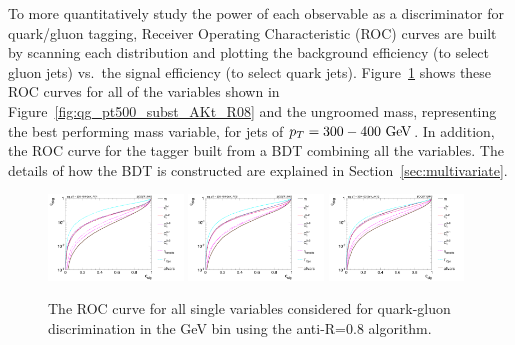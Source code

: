 To more quantitatively study the power of each observable as a
discriminator for quark/gluon tagging, Receiver Operating Characteristic (ROC) curves are built by scanning each distribution
and plotting the background efficiency (to select gluon jets) vs.~the signal efficiency (to select quark jets). 
Figure~\ref{fig:qg_pt300_single} shows these ROC curves for all of the variables shown in 
Figure~\ref{fig:qg_pt500_subst_AKt_R08} and the ungroomed mass, representing the 
best performing mass variable, for jets of $\pt=300-400\GeV$. In addition, the ROC curve for 
the tagger built from a BDT combining all the variables. The details of how the BDT is constructed 
are explained in Section~\ref{sec:multivariate}. 

\begin{figure}
\begin{center}
\includegraphics[width=0.32\textwidth]{./Figures/QGTagging/pT300/AKtR04/Rocs_1D_single.png}
\includegraphics[width=0.32\textwidth]{./Figures/QGTagging/pT300/AKtR08/Rocs_1D_single.png}
\includegraphics[width=0.32\textwidth]{./Figures/QGTagging/pT300/AKtR12/Rocs_1D_single.png}
\caption{The ROC curve for all single variables considered for quark-gluon discrimination in the  GeV bin using the anti-\kT R=0.8 algorithm.}
\label{fig:qg_pt300_single}
\end{center}
\end{figure}
